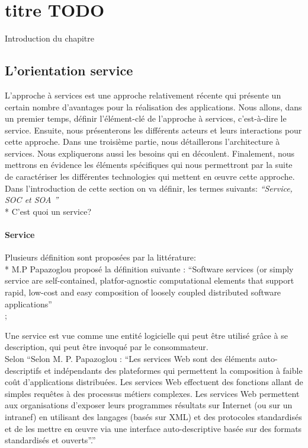 
\chapter{titre TODO}
Introduction du chapitre %

    \section{L'orientation service}
    	L'approche à services est une approche relativement récente qui présente un certain nombre d'avantages pour 
	la réalisation des applications. Nous allons, dans un premier temps, définir l'élément-clé de l'approche 
	à services, c'est-à-dire le service. Ensuite, nous présenterons les différents acteurs et leurs interactions 
	pour cette approche. Dans une troisième partie, nous détaillerons l'architecture à services. Nous expliquerons 
	aussi les besoins qui en découlent. Finalement, nous mettrons en évidence les éléments spécifiques qui nous 
	permettront par la suite de caractériser les différentes technologies qui mettent en œuvre cette approche.\\

	Dans l'introduction de cette section on va définir,  les termes suivants: \emph{``Service, SOC et SOA ''}\\
	    * C'est quoi un service?\\

	\subsubsection{Service}
	    Plusieurs définition sont proposées par la littérature:\\

	    * M.P Papazoglou proposé la définition suivante :\cite{Papazoglou:what_is_a_service?} ``Software 
	    services (or simply service are self-contained, platfor-agnostic computational elements that support 
	    rapid, low-cost and easy composition of loosely coupled distributed software applications''\\	;
	    
	    Une service est vue comme une entité logicielle qui peut être utilisé grâce à se description, 
	    qui peut être invoqué par le consommateur. \\

	    Selon \cite{Papazoglou:2007:SOA:1265289.1265298} ``Selon M. P. Papazoglou : ``Les services Web sont 
	    des éléments auto-descriptifs  et indépendants des plateformes qui permettent la composition à faible 
	    coût d'applications  distribuées. Les services Web effectuent des fonctions allant  de simples requêtes à  
	    des processus métiers complexes. Les services Web permettent aux organisations d'exposer  leurs programmes 
	    résultats sur Internet (ou sur un intranef) en utilisant des langages  (basés sur XML) et des protocoles 
	    standardisés et de les mettre en œuvre via une interface auto-descriptive basée sur des formats 
	    standardisés et ouverts''.''\\


